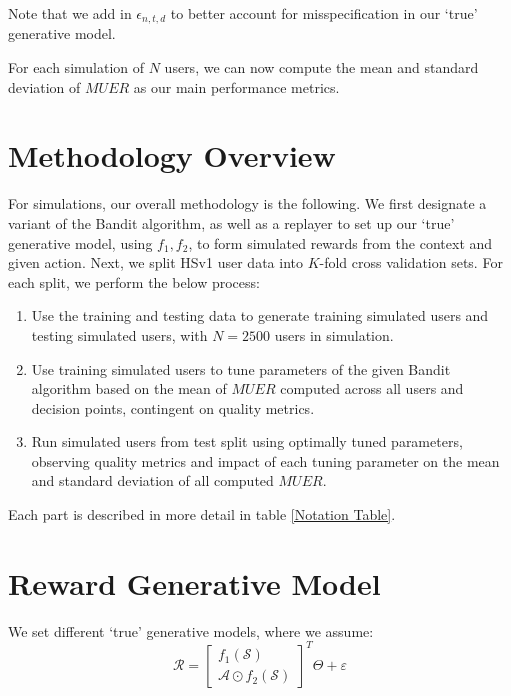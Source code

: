 Note that we add in $\epsilon_{n,t,d}$ to better account for misspecification in our `true' generative model.


For each simulation of $N$ users, we can now compute the mean and standard deviation of $MUER$ as our main performance metrics. \\

\section{Methodology Overview}

For simulations, our overall methodology is the following.  We first designate a variant of the Bandit algorithm, as well as a replayer to set up our `true' generative model, using $f_1,f_2$, to form simulated rewards from the context and given action.  Next, we split HSv1 user data into $K$-fold cross validation sets.  For each split, we perform the below process:

\begin{enumerate}
	\item Use the training and testing data to generate training simulated users and testing simulated users, with $N = 2500$ users in simulation.  
	\item Use training simulated users to tune parameters of the given Bandit algorithm based on the mean of $MUER$ computed across all users and decision points, contingent on quality metrics.
	\item Run simulated users from test split using optimally tuned parameters, observing quality metrics and impact of each tuning parameter on the mean and standard deviation of all computed $MUER$.
\end{enumerate}

Each part is described in more detail in table \ref{Notation Table}.


\section{Reward Generative Model}

We set different `true' generative models, where we assume:
\begin{equation}
\label{True Generative Model}
\mathcal{R} = \begin{bmatrix}f_1(\mathcal{S}) \\
\mathcal{A} \odot f_2(\mathcal{S})
\end{bmatrix}^T \Theta + \varepsilon
\end{equation}

